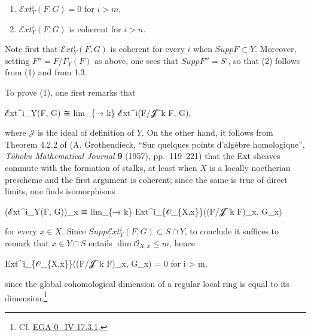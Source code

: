 \documentclass[
  11pt,
  a4paper,
]{book}
\newenvironment{Shaded}{}{}
\newcommand{\NormalTok}[1]{#1}
\providecommand{\tightlist}{%
  \setlength{\itemsep}{0pt}\setlength{\parskip}{0pt}}
\begin{document}
\begin{enumerate}
\def\labelenumi{\arabic{enumi}.}
\tightlist
\item
  \(\mathcal{E}xt^{i}_{Y}(F, G) = 0\) for \(i > m\),
\item
  \(\mathcal{E}xt^{i}_{Y}(F, G)\) is coherent for \(i > n\).
\end{enumerate}

Note first that \(\mathcal{E}xt^{i}_{Y}(F, G)\) is coherent for every
\(i\) when \(Supp F \subset Y\). Moreover, setting \(F''
= F/\Gamma_{Y}(F)\) as above, one sees that \(Supp F'' = S'\), so that
(2) follows from (1) and from 1.3.

To prove (1), one first remarks that

\begin{Shaded}
\begin{Highlighting}[]
\NormalTok{ℰxt\^{}i\_Y(F, G) ≅ lim\_\{→ k\} ℰxt\^{}i(F/𝓙\^{}k F, G),}
\end{Highlighting}
\end{Shaded}

where \(\mathcal{J}\) is the ideal of definition of \(Y\). On the other
hand, it follows from Theorem 4.2.2 of (A. Grothendieck, ``Sur quelques
points d'algèbre homologique'', \emph{Tôhoku Mathematical Journal}
\textbf{9} (1957), pp.~119--221) that the Ext sheaves commute with the
formation of stalks, at least when \(X\) is a locally noetherian
prescheme and the first argument is coherent; since the same is true of
direct limits, one finds isomorphisms

\begin{Shaded}
\begin{Highlighting}[]
\NormalTok{(ℰxt\^{}i\_Y(F, G))\_x ≅ lim\_\{→ k\} Ext\^{}i\_\{𝒪\_\{X,x\}\}((F/𝓙\^{}k F)\_x, G\_x)}
\end{Highlighting}
\end{Shaded}

for every \(x \in X\). Since
\(Supp \mathcal{E}xt^{i}_{Y}(F, G) \subset S \cap Y\), to conclude it
suffices to remark that \(x \in Y \cap S\) entails
\(\dim \mathcal{O}_{X,x} \leqslant m\), hence

\begin{Shaded}
\begin{Highlighting}[]
\NormalTok{Ext\^{}i\_\{𝒪\_\{X,x\}\}((F/𝓙\^{}k F)\_x, G\_x) = 0 for i \textgreater{} m,}
\end{Highlighting}
\end{Shaded}

since the global cohomological dimension of a regular local ring is
equal to its dimension.\footnote{Cf.
  \href{https://jcreinhold.github.io/ega/iv/04-ch0-17-regular-rings.html\#173-cohomological-theory-of-regular-rings}{EGA
  0\_IV 17.3.1}.}
\end{document}
